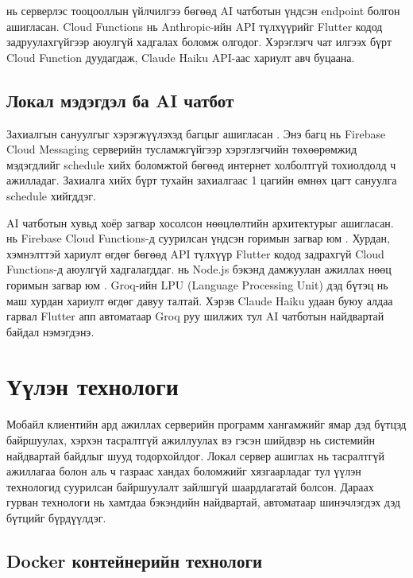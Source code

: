  нь серверлэс тооцооллын үйлчилгээ бөгөөд AI чатботын үндсэн endpoint болгон ашигласан. Cloud Functions нь Anthropic-ийн API түлхүүрийг Flutter кодод задруулахгүйгээр аюулгүй хадгалах боломж олгодог. Хэрэглэгч чат илгээх бүрт Cloud Function дуудагдаж, Claude Haiku API-аас хариулт авч буцаана.

\subsection*{Локал мэдэгдэл ба AI чатбот}

Захиалгын сануулгыг хэрэгжүүлэхэд  багцыг ашигласан \cite{local_notifications_doc}. Энэ багц нь Firebase Cloud Messaging серверийн тусламжгүйгээр хэрэглэгчийн төхөөрөмжид мэдэгдлийг schedule хийх боломжтой бөгөөд интернет холболтгүй тохиолдолд ч ажилладаг. Захиалга хийх бүрт тухайн захиалгаас 1 цагийн өмнөх цагт сануулга schedule хийгддэг.

AI чатботын хувьд хоёр загвар хосолсон нөөцлөлтийн архитектурыг ашигласан.  нь Firebase Cloud Functions-д суурилсан үндсэн горимын загвар юм \cite{anthropic_doc}. Хурдан, хэмнэлттэй хариулт өгдөг бөгөөд API түлхүүр Flutter кодод задрахгүй Cloud Functions-д аюулгүй хадгалагддаг.  нь Node.js бэкэнд дамжуулан ажиллах нөөц горимын загвар юм \cite{groq_doc}. Groq-ийн LPU (Language Processing Unit) дэд бүтэц нь маш хурдан хариулт өгдөг давуу талтай. Хэрэв Claude Haiku удаан буюу алдаа гарвал Flutter апп автоматаар Groq руу шилжих тул AI чатботын найдвартай байдал нэмэгдэнэ.


\section{Үүлэн технологи}

Мобайл клиентийн ард ажиллах серверийн программ хангамжийг ямар дэд бүтцэд байршуулах, хэрхэн тасралтгүй ажиллуулах вэ гэсэн шийдвэр нь системийн найдвартай байдлыг шууд тодорхойлдог. Локал сервер ашиглах нь тасралтгүй ажиллагаа болон аль ч газраас хандах боломжийг хязгаарладаг тул үүлэн технологид суурилсан байршуулалт зайлшгүй шаардлагатай болсон. Дараах гурван технологи нь хамтдаа бэкэндийн найдвартай, автоматаар шинэчлэгдэх дэд бүтцийг бүрдүүлдэг.

\subsection*{Docker контейнерийн технологи}

